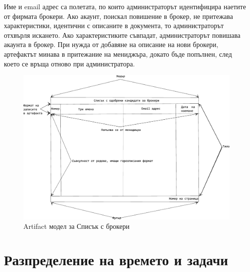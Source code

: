 \documentclass[a4paper]{article}
\begin{document}
Име и email адрес са полетата, по които администраторът идентифицира наетите от фирмата брокери. Ако акаунт, поискал повишение в брокер, не притежава характеристики, идентични с описаните в документа, то администраторът отхвърля искането. Ако характеристиките съвпадат, администраторът повишава акаунта в брокер. При нужда от добавяне на описание на нови брокери, артефактът минава в притежание на мениджъра, докато бъде попълнен, след което се връща отново при администратора. 

	\begin{figure}[h]
	\centering
	\includegraphics[scale=0.85]{art-textFile}
	\caption{Artifact модел за Списък с брокери}
	\end{figure}


\clearpage

\section{Разпределение на времето и задачи}
\end{document}

